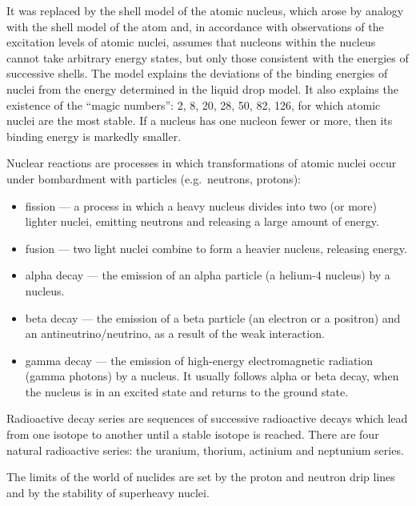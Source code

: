 It was replaced by the shell model of the atomic nucleus, which arose by analogy with the shell model of the atom and, in accordance with observations of the excitation levels of atomic nuclei, assumes that nucleons within the nucleus cannot take arbitrary energy states, but only those consistent with the energies of successive shells. The model explains the deviations of the binding energies of nuclei from the energy determined in the liquid drop model. It also explains the existence of the ``magic numbers'': 2, 8, 20, 28, 50, 82, 126, for which atomic nuclei are the most stable. If a nucleus has one nucleon fewer or more, then its binding energy is markedly smaller.

Nuclear reactions are processes in which transformations of atomic nuclei occur under bombardment with particles (e.g.\ neutrons, protons):

\begin{itemize}
    \item fission --- a process in which a heavy nucleus divides into two (or more) lighter nuclei, emitting neutrons and releasing a large amount of energy.
    \item fusion --- two light nuclei combine to form a heavier nucleus, releasing energy.
    \item alpha decay --- the emission of an alpha particle (a helium-4 nucleus) by a nucleus.
    \item beta decay --- the emission of a beta particle (an electron or a positron) and an antineutrino/neutrino, as a result of the weak interaction.
    \item gamma decay --- the emission of high-energy electromagnetic radiation (gamma photons) by a nucleus. It usually follows alpha or beta decay, when the nucleus is in an excited state and returns to the ground state.
\end{itemize}

Radioactive decay series are sequences of successive radioactive decays which lead from one isotope to another until a stable isotope is reached. There are four natural radioactive series: the uranium, thorium, actinium and neptunium series.\merr

The limits of the world of nuclides are set by the proton and neutron drip lines and by the stability of superheavy nuclei.

